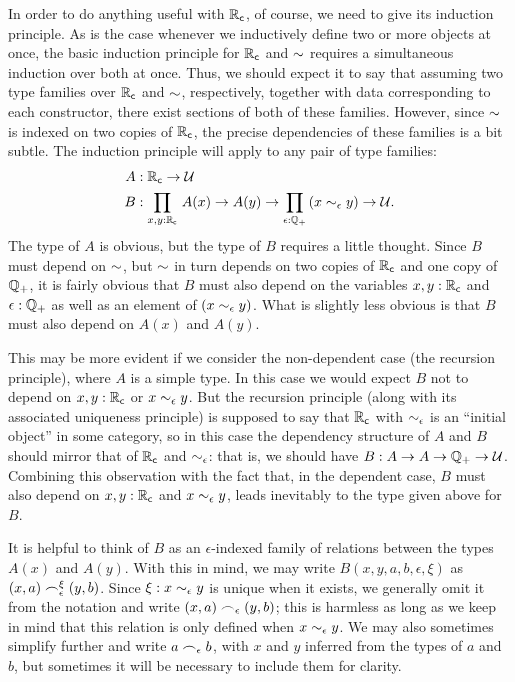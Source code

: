 In order to do anything useful with $\mathbb{R}_\mathsf{c}$, of course, we need to give its induction principle.
As is the case whenever we inductively define two or more objects at once, the basic induction principle for $\mathbb{R}_\mathsf{c}$ and $\mathord\sim$ requires a simultaneous induction over both at once.
Thus, we should expect it to say that assuming two type families over $\mathbb{R}_\mathsf{c}$ and $\mathord\sim$, respectively, together with data corresponding to each constructor, there exist sections of both of these families.
However, since $\mathord\sim$ is indexed on two copies of $\mathbb{R}_\mathsf{c}$, the precise dependencies of these families is a bit subtle.
The induction principle will apply to any pair of type families:
\begin{align*}
A&:\RC\to\type\\
B&:\prd{x,y:\RC} A(x) \to A(y) \to \prd{\epsilon:\Qp} (x\close\epsilon y) \to \type.
\end{align*}
The type of $A$ is obvious, but the type of $B$ requires a little thought.
Since $B$ must depend on $\mathord\sim$, but $\mathord\sim$ in turn depends on two copies of $\mathbb{R}_\mathsf{c}$ and one copy of $\mathbb{Q}_{+}$, it is fairly obvious that $B$ must also depend on the variables $x,y:\mathbb{R}_\mathsf{c}$ and $\epsilon:\mathbb{Q}_{+}$ as well as an element of $(x\sim_{\epsilon} y)$.
What is slightly less obvious is that $B$ must also depend on $A(x)$ and $A(y)$.

This may be more evident if we consider the non-dependent case (the recursion principle), where $A$ is a simple type.
In this case we would expect $B$ not to depend on $x,y:\mathbb{R}_\mathsf{c}$ or $x\sim_{\epsilon} y$.
But the recursion principle (along with its associated uniqueness principle) is supposed to say that $\mathbb{R}_\mathsf{c}$ with $\sim_{\epsilon}$ is an ``initial object'' in some category, so in this case the dependency structure of $A$ and $B$ should mirror that of $\mathbb{R}_\mathsf{c}$ and $\sim_{\epsilon}$: that is, we should have $B:A\to A\to \mathbb{Q}_{+} \to \mathcal{U}$.
Combining this observation with the fact that, in the dependent case, $B$ must also depend on $x,y:\mathbb{R}_\mathsf{c}$ and $x\sim_{\epsilon} y$, leads inevitably to the type given above for $B$.

It is helpful to think of $B$ as an $\epsilon$-indexed family of relations between the types $A(x)$ and $A(y)$.
With this in mind, we may write $B(x,y,a,b,\epsilon,\xi)$ as $(x,a) \frown_\epsilon^\xi (y,b)$.
Since $\xi:x\sim_{\epsilon} y$ is unique when it exists, we generally omit it from the notation and write $(x,a) \frown_\epsilon (y,b)$; this is harmless as long as we keep in mind that this relation is only defined when $x\sim_{\epsilon} y$.
We may also sometimes simplify further and write $a\frown_\epsilon b$, with $x$ and $y$ inferred from the types of $a$ and $b$, but sometimes it will be necessary to include them for clarity.

